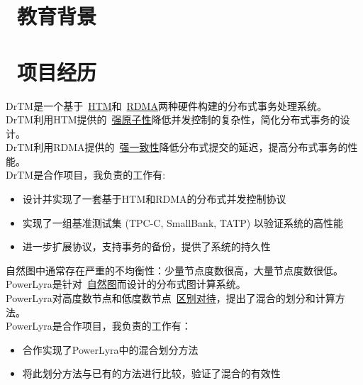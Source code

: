 \documentclass{resume}
\begin{document}


 
\section{\faGraduationCap\ 教育背景}

\section{\faUsers\ 项目经历}
DrTM是一个基于\ \underline{HTM}和\ \underline{RDMA}两种硬件构建的分布式事务处理系统。
\\[2pt]
DrTM利用HTM提供的\ \underline{强原子性}降低并发控制的复杂性，简化分布式事务的设计。
\\[2pt]
DrTM利用RDMA提供的\ \underline{强一致性}降低分布式提交的延迟，提高分布式事务的性能。
\\[2pt]
DrTM是合作项目，我负责的工作有:
\begin{itemize}[parsep=0.5ex]
  \item 设计并实现了一套基于HTM和RDMA的分布式并发控制协议
  \item 实现了一组基准测试集 (TPC-C, SmallBank, TATP) 以验证系统的高性能
  \item 进一步扩展协议，支持事务的备份，提供了系统的持久性
\end{itemize}

自然图中通常存在严重的不均衡性：少量节点度数很高，大量节点度数很低。
\\[2pt]
PowerLyra是针对\ \underline{自然图}而设计的分布式图计算系统。
\\[2pt]
PowerLyra对高度数节点和低度数节点\ \underline{区别对待}，提出了混合的划分和计算方法。
\\[2pt]
PowerLyra是合作项目，我负责的工作有：
\begin{itemize}[parsep=0.5ex]
  \item 合作实现了PowerLyra中的混合划分方法
  \item 将此划分方法与已有的方法进行比较，验证了混合的有效性
\end{itemize}
\end{document}
